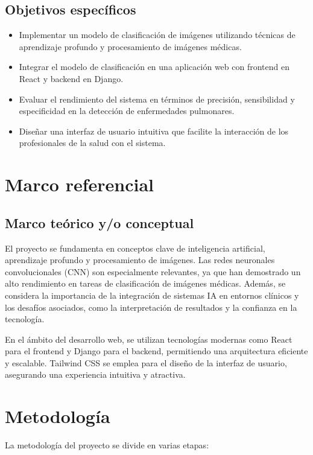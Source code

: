 \documentclass[conference]{IEEEtran}
\begin{document}
\subsection{Objetivos específicos}
\begin{itemize}
    \item Implementar un modelo de clasificación de imágenes utilizando técnicas de aprendizaje profundo y procesamiento de imágenes médicas.
    \item Integrar el modelo de clasificación en una aplicación web con frontend en React y backend en Django.
    \item Evaluar el rendimiento del sistema en términos de precisión, sensibilidad y especificidad en la detección de enfermedades pulmonares.
    \item Diseñar una interfaz de usuario intuitiva que facilite la interacción de los profesionales de la salud con el sistema.
\end{itemize}

\section{Marco referencial}

\subsection{Marco teórico y/o conceptual}
El proyecto se fundamenta en conceptos clave de inteligencia artificial, aprendizaje profundo y procesamiento de imágenes. Las redes neuronales convolucionales (CNN) son especialmente relevantes, ya que han demostrado un alto rendimiento en tareas de clasificación de imágenes médicas. Además, se considera la importancia de la integración de sistemas IA en entornos clínicos y los desafíos asociados, como la interpretación de resultados y la confianza en la tecnología.

En el ámbito del desarrollo web, se utilizan tecnologías modernas como React para el frontend y Django para el backend, permitiendo una arquitectura eficiente y escalable. Tailwind CSS se emplea para el diseño de la interfaz de usuario, asegurando una experiencia intuitiva y atractiva.

\section{Metodología}
La metodología del proyecto se divide en varias etapas:
\end{document}
